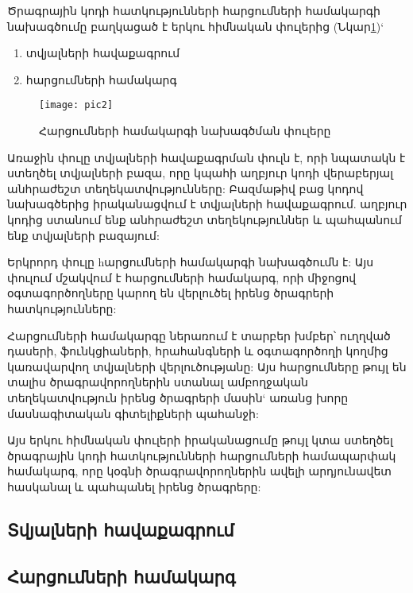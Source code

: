     {
        Ծրագրային կոդի հատկությունների հարցումների համակարգի նախագծումը բաղկացած է երկու հիմնական փուլերից (Նկար\ref{fig:figure2})`
        \begin{enumerate}
            \item տվյալների հավաքագրում
            \item հարցումների համակարգ
        \end{enumerate}
        \begin{figure}[h]
                \centering
                \texttt{[image: pic2]}
                \caption{Հարցումների համակարգի նախագծման փուլերը}
                \label{fig:figure2}
        \end{figure}

        Առաջին փուլը տվյալների հավաքագրման փուլն է, որի նպատակն է ստեղծել տվյալների բազա, որը կպահի աղբյուր կոդի
        վերաբերյալ անհրաժեշտ տեղեկատվությունները:
        Բազմաթիվ բաց կոդով նախագծերից իրականացվում է տվյալների հավաքագրում.
        աղբյուր կոդից ստանում ենք անհրաժեշտ տեղեկություններ
        և պահպանում ենք տվյալների բազայում:

        Երկրորդ փուլը hարցումների համակարգի նախագծումն է: Այս փուլում մշակվում է հարցումների համակարգ, որի միջոցով օգտագործողները կարող են վերլուծել իրենց ծրագրերի հատկությունները:

        Հարցումների համակարգը ներառում է տարբեր խմբեր՝ ուղղված դասերի, ֆունկցիաների, հրահանգների և օգտագործողի կողմից կառավարվող տվյալների վերլուծությանը: Այս հարցումները թույլ են տալիս ծրագրավորողներին ստանալ ամբողջական տեղեկատվություն իրենց ծրագրերի մասին` առանց խորը մասնագիտական գիտելիքների պահանջի:

        Այս երկու հիմնական փուլերի իրականացումը թույլ կտա ստեղծել ծրագրային կոդի հատկությունների հարցումների համապարփակ համակարգ, որը կօգնի ծրագրավորողներին ավելի արդյունավետ հասկանալ և պահպանել իրենց ծրագրերը:

        \subsection{Տվյալների հավաքագրում}\label{subsec:dataCollection}
        

        \subsection{Հարցումների համակարգ}\label{subsec:queries}
        
    }

